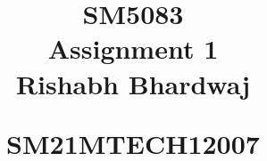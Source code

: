 \documentclass[journal,12pt,twocolumn]{IEEEtran}
\begin{document}
%


\newtheorem{theorem}{Theorem}[section]
\newtheorem{problem}{Problem}
\newtheorem{proposition}{Proposition}[section]
\newtheorem{lemma}{Lemma}[section]
\newtheorem{corollary}[theorem]{Corollary}
\newtheorem{example}{Example}[section]
\newtheorem{definition}[problem]{Definition}
\newcommand{\BEQA}{\begin{eqnarray}}
\newcommand{\EEQA}{\end{eqnarray}}
\newcommand{\define}{\stackrel{\triangle}{=}}

\providecommand{\mbf}{\mathbf}
\providecommand{\pr}[1]{\ensuremath{\Pr\left(#1\right)}}
\providecommand{\qfunc}[1]{\ensuremath{Q\left(#1\right)}}
\providecommand{\sbrak}[1]{\ensuremath{{}\left[#1\right]}}
\providecommand{\lsbrak}[1]{\ensuremath{{}\left[#1\right.}}
\providecommand{\rsbrak}[1]{\ensuremath{{}\left.#1\right]}}
\providecommand{\brak}[1]{\ensuremath{\left(#1\right)}}
\providecommand{\lbrak}[1]{\ensuremath{\left(#1\right.}}
\providecommand{\rbrak}[1]{\ensuremath{\left.#1\right)}}
\providecommand{\cbrak}[1]{\ensuremath{\left\{#1\right\}}}
\providecommand{\lcbrak}[1]{\ensuremath{\left\{#1\right.}}
\providecommand{\rcbrak}[1]{\ensuremath{\left.#1\right\}}}
\theoremstyle{remark}
\newtheorem{rem}{Remark}
\newcommand{\sgn}{\mathop{\mathrm{sgn}}}
\providecommand{\abs}[1]{\lvert#1\rvert}
\providecommand{\res}[1]{\Res\displaylimits_{#1}} 
\providecommand{\norm}[1]{\lVert#1\rVert}
\providecommand{\mtx}[1]{\mathbf{#1}}
\providecommand{\fourier}{\overset{\mathcal{F}}{ \rightleftharpoons}}
\providecommand{\system}{\overset{\mathcal{H}}{ \longleftrightarrow}}
\newcommand{\solution}{\noindent \textbf{Solution: }}
\newcommand{\cosec}{\,\text{cosec}\,}
\providecommand{\dec}[2]{\ensuremath{\overset{#1}{\underset{#2}{\gtrless}}}}
\newcommand{\myvec}[1]{\ensuremath{\begin{pmatrix}#1\end{pmatrix}}}
\newcommand{\cmyvec}[1]{\ensuremath{\begin{pmatrix*}[c]#1\end{pmatrix*}}}
\newcommand{\mydet}[1]{\ensuremath{\begin{vmatrix}#1\end{vmatrix}}}
\newcommand{\proj}[2]{\textbf{proj}_{\vec{#1}}\vec{#2}}
\newcommand{\RNum}[1]{\uppercase\expandafter{\romannumeral #1\relax}}
\let\StandardTheFigure\thefigure
\let\vec\mathbf
\title{
\LARGE SM5083\\
    \LARGE Assignment 1 \\[0.5em]
    
    \large Rishabh Bhardwaj\par
    \large   SM21MTECH12007  \par
}
\maketitle
\renewcommand{\thefigure}{\theenumi}
\renewcommand{\thetable}{\theenumi}
\end{document}
